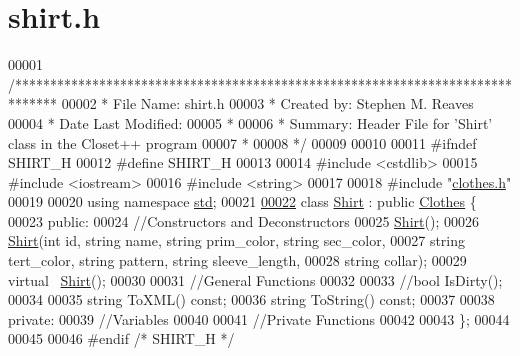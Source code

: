 \hypertarget{shirt_8h_source}{}\section{shirt.\+h}

\begin{DoxyCode}
00001 \textcolor{comment}{/******************************************************************************}
00002 \textcolor{comment}{ * File Name: shirt.h}
00003 \textcolor{comment}{ * Created by: Stephen M. Reaves}
00004 \textcolor{comment}{ * Date Last Modified:}
00005 \textcolor{comment}{ *}
00006 \textcolor{comment}{ * Summary: Header File for 'Shirt' class in the Closet++ program}
00007 \textcolor{comment}{ *}
00008 \textcolor{comment}{ */}
00009 
00010 
00011 \textcolor{preprocessor}{#ifndef SHIRT\_H}
00012 \textcolor{preprocessor}{#define SHIRT\_H}
00013 
00014 \textcolor{preprocessor}{#include <cstdlib>}
00015 \textcolor{preprocessor}{#include <iostream>}
00016 \textcolor{preprocessor}{#include <string>}
00017 
00018 \textcolor{preprocessor}{#include "\mbox{\hyperlink{clothes_8h}{clothes.h}}"}
00019 
00020 \textcolor{keyword}{using namespace }\mbox{\hyperlink{namespacestd}{std}};
00021 
\mbox{\hyperlink{classShirt}{00022}} \textcolor{keyword}{class }\mbox{\hyperlink{classShirt}{Shirt}} : \textcolor{keyword}{public} \mbox{\hyperlink{classClothes}{Clothes}} \{
00023   \textcolor{keyword}{public}:
00024     \textcolor{comment}{//Constructors and Deconstructors}
00025     \mbox{\hyperlink{classShirt}{Shirt}}();
00026     \mbox{\hyperlink{classShirt}{Shirt}}(\textcolor{keywordtype}{int} \textcolor{keywordtype}{id}, \textcolor{keywordtype}{string} name, \textcolor{keywordtype}{string} prim\_color, \textcolor{keywordtype}{string} sec\_color, 
00027           \textcolor{keywordtype}{string} tert\_color, \textcolor{keywordtype}{string} pattern, \textcolor{keywordtype}{string} sleeve\_length, 
00028           \textcolor{keywordtype}{string} collar);
00029     \textcolor{keyword}{virtual} ~\mbox{\hyperlink{classShirt}{Shirt}}();
00030 
00031     \textcolor{comment}{//General Functions}
00032 
00033     \textcolor{comment}{//bool IsDirty();}
00034 
00035     \textcolor{keywordtype}{string} ToXML() \textcolor{keyword}{const};
00036     \textcolor{keywordtype}{string} ToString() \textcolor{keyword}{const};
00037   
00038   \textcolor{keyword}{private}:
00039     \textcolor{comment}{//Variables}
00040 
00041     \textcolor{comment}{//Private Functions}
00042 
00043 \};
00044 
00045 
00046 \textcolor{preprocessor}{#endif }\textcolor{comment}{/* SHIRT\_H */}\textcolor{preprocessor}{ }
\end{DoxyCode}
